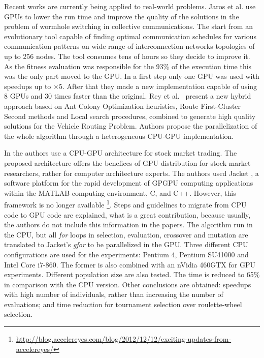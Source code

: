 \documentclass{article}
\begin{document}
Recent works are currently being applied to real-world problems. Jaros et al. \cite{Jaros14Wormhole} use GPUs to lower the run time and improve the quality of the solutions in the problem of wormhole switching in collective communications. The start from an evolutionary tool capable of finding optimal communication schedules for various communication patterns on wide range of interconnection networks topologies of up to 256 nodes. The tool consumes tens of hours so they decide to improve it. As the fitness evaluation was responsible for the 93\% of the execution time this was the only part moved to the GPU. In a first step only one GPU was used with speedups up to $\times5$. After that they made a new implementation capable of using 8 GPUs and 30 times faster than the original.
Rey et al. \cite{Rey2018} present a new hybrid approach based on Ant Colony Optimization heuristics, Route First-Cluster Second methods and Local search procedures, combined to generate high quality solutions for the Vehicle Routing Problem. Authors propose the parallelization of the whole algorithm through a heterogeneous CPU-GPU implementation.

In \cite{Contreras:2012:UGA:2150467.2150469} the authors use a CPU-GPU architecture for stock market trading. The proposed architecture offers the benefices of GPU distribution for stock market researchers, rather for computer architecture experts. The authors used Jacket \cite{jacket:Matlab}, a software platform for the rapid development of GPGPU computing applications within the MATLAB computing environment, C, and C++. However, this framework is no longer available \footnote{\url{http://blog.accelereyes.com/blog/2012/12/12/exciting-updates-from-accelereyes/}}. Steps and guidelines to migrate from CPU code to GPU code are explained, what is a great contribution, because usually, the authors do not include this information in the papers. The algorithm run in the CPU, but all  {\em for} loops in selection, evaluation, crossover and mutation are translated to Jacket's {\em gfor} to be parallelized in the GPU. Three different CPU configurations are used for the experiments: Pentium 4, Pentium SU41000 and Intel Core i7-860. The former is also combined with an nVidia 460GTX for GPU experiments. Different population size are also tested. The time is reduced to 65\% in comparison with the CPU version. Other conclusions are obtained: speedups with high number of individuals, rather than increasing the number of evaluations; and time reduction for  tournament selection  over roulette-wheel selection.
\end{document}
